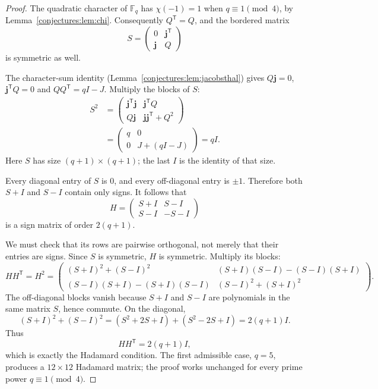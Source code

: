 \begin{proof}
The quadratic character of $\mathbb F_q$ has $\chi(-1)=1$ when $q\equiv1\pmod4$, by Lemma~\ref{conjectures:lem:chi}. Consequently $Q^{\mathsf T}=Q$, and the bordered matrix
\[
S=\begin{pmatrix}0&\mathbf j^{\mathsf T}\\\mathbf j&Q\end{pmatrix}
\]
is symmetric as well.

The character-sum identity (Lemma~\ref{conjectures:lem:jacobsthal}) gives $Q\mathbf j=0$, $\mathbf j^{\mathsf T}Q=0$ and $QQ^{\mathsf T}=qI-J$. Multiply the blocks of $S$:
\[
\begin{aligned}
S^2
&=\begin{pmatrix}
\mathbf j^{\mathsf T}\mathbf j&\mathbf j^{\mathsf T}Q\\
Q\mathbf j&\mathbf j\mathbf j^{\mathsf T}+Q^2
\end{pmatrix}\\
&=\begin{pmatrix}
q&0\\0&J+(qI-J)
\end{pmatrix}
=qI.
\end{aligned}
\]
Here $S$ has size $(q+1)\times(q+1)$; the last $I$ is the identity of that size.

Every diagonal entry of $S$ is $0$, and every off-diagonal entry is $\pm1$. Therefore both $S+I$ and $S-I$ contain only signs. It follows that
\[
H=\begin{pmatrix}S+I&S-I\\S-I&-S-I\end{pmatrix}
\]
is a sign matrix of order $2(q+1)$.

We must check that its rows are pairwise orthogonal, not merely that their entries are signs. Since $S$ is symmetric, $H$ is symmetric. Multiply its blocks:
\[
HH^{\mathsf T}=H^2=
\begin{pmatrix}
(S+I)^2+(S-I)^2&(S+I)(S-I)-(S-I)(S+I)\\
(S-I)(S+I)-(S+I)(S-I)&(S-I)^2+(S+I)^2
\end{pmatrix}.
\]
The off-diagonal blocks vanish because $S+I$ and $S-I$ are polynomials in the same matrix $S$, hence commute. On the diagonal,
\[
(S+I)^2+(S-I)^2
=(S^2+2S+I)+(S^2-2S+I)
=2(q+1)I.
\]
Thus
\[
HH^{\mathsf T}=2(q+1)I,
\]
which is exactly the Hadamard condition. The first admissible case, $q=5$, produces a $12\times12$ Hadamard matrix; the proof works unchanged for every prime power $q\equiv1\pmod4$.
\end{proof}


